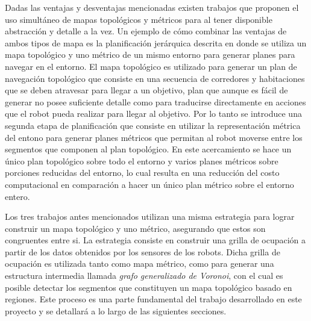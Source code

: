 Dadas las ventajas y desventajas mencionadas existen trabajos \cite{Thrun1998,wurm2008coordinated,Liu2015} que proponen el uso simultáneo de mapas topológicos y métricos para  al tener disponible abstracción y detalle a la vez. Un ejemplo de cómo combinar las ventajas de ambos tipos de mapa es la planificación jerárquica descrita en \cite{Thrun1998} donde se utiliza un mapa topológico y uno métrico de un mismo entorno para generar planes para navegar en el entorno. El mapa topológico es utilizado para generar un plan de navegación topológico que consiste en una secuencia de corredores y habitaciones que se deben atravesar para llegar a un objetivo, plan que aunque es fácil de generar no posee suficiente detalle como para traducirse directamente en acciones que el robot pueda realizar para llegar al objetivo. Por lo tanto se introduce una segunda etapa de planificación que consiste en utilizar la representación métrica del entono para generar planes métricos que permitan al robot moverse entre los segmentos que componen al plan topológico. En este acercamiento se hace un único plan topológico sobre todo el entorno y varios planes métricos sobre porciones reducidas del entorno, lo cual resulta en una reducción del costo computacional en comparación a hacer un único plan métrico sobre el entorno entero.

Los tres trabajos antes mencionados utilizan una misma estrategia para lograr construir un mapa topológico y uno métrico, asegurando que estos son congruentes entre si. La estrategia consiste en construir una grilla de ocupación a partir de los datos obtenidos por los sensores de los robots. Dicha grilla de ocupación es utilizada tanto como mapa métrico, como para generar una estructura intermedia llamada \emph{grafo generalizado de Voronoi}, con el cual es posible detectar los segmentos que constituyen un mapa topológico basado en regiones. Este proceso es una parte fundamental del trabajo desarrollado en este proyecto y se detallará a lo largo de las siguientes secciones.%


